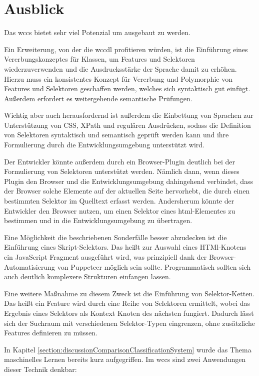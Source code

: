 \section{Ausblick}
    \label{section:endingOutlook}
    Das \gls{wccs} bietet sehr viel Potenzial um ausgebaut zu werden.

    Ein Erweiterung, von der die \gls{wccdl} profitieren würden,
    ist die Einführung eines Vererbungskonzeptes für Klassen,
    um Features und Selektoren wiederzuverwenden und die Ausdrucksstärke
    der Sprache damit zu erhöhen.
    Hierzu muss ein konsistentes Konzept für Vererbung und Polymorphie
    von Features und Selektoren geschaffen werden,
    welches sich syntaktisch gut einfügt.
    Außerdem erfordert es weitergehende semantische Prüfungen.

    Wichtig aber auch herausfordernd ist außerdem die Einbettung
    von Sprachen zur Unterstützung von CSS, XPath und regulären Ausdrücken,
    sodass die Definition von Selektoren syntaktisch und semantisch geprüft werden kann
    und ihre Formulierung durch die Entwicklungsumgebung unterstützt wird.

    Der Entwickler könnte außerdem durch ein Browser-Plugin
    deutlich bei der Formulierung von Selektoren unterstützt werden.
    Nämlich dann, wenn dieses Plugin den Browser und die Entwicklungsumgebung
    dahingehend verbindet, dass der Browser solche Elemente auf der aktuellen Seite
    hervorhebt, die durch einen bestimmten Selektor im Quelltext erfasst werden.
    Andersherum könnte der Entwickler den Browser nutzen,
    um einen Selektor eines \gls{html}-Elementes zu bestimmen und
    in die Entwicklungsumgebung zu übertragen.

    Eine Möglichkeit die beschriebenen Sonderfälle besser abzudecken ist die
    Einführung eines Skript-Selektors.
    Das heißt zur Auswahl eines HTMl-Knotens ein JavaScript Fragment ausgeführt wird,
    was prinzipiell dank der Browser-Automatisierung von Puppeteer möglich sein sollte.
    Programmatisch sollten sich auch deutlich komplexere Strukturen einfangen lassen.

    Eine weitere Maßnahme zu diesem Zweck ist die Einführung von Selektor-Ketten.
    Das heißt ein Feature wird durch eine Reihe von Selektoren
    ermittelt, wobei das Ergebnis eines Selektors als Kontext Knoten des nächsten fungiert.
    Dadurch lässt sich der Suchraum mit verschiedenen Selektor-Typen eingrenzen,
    ohne zusätzliche Features definieren zu müssen.

    In Kapitel \ref{section:discussionComparisonClassificationSystem}
    wurde das Thema maschinelles Lernen bereits kurz aufgegriffen.
    Im \gls{wccs} sind zwei Anwendungen dieser Technik denkbar:

